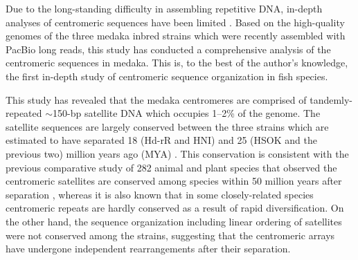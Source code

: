 Due to the long-standing difficulty in assembling repetitive DNA, in-depth analyses of centromeric sequences have been limited \cite{Plohl2014}. Based on the high-quality genomes of the three medaka inbred strains which were recently assembled with PacBio long reads, this study has conducted a comprehensive analysis of the centromeric sequences in medaka. This is, to the best of the author's knowledge, the first in-depth study of centromeric sequence organization in fish species.

This study has revealed that the medaka centromeres are comprised of tandemly-repeated $\sim$150-bp satellite DNA which occupies 1--2\% of the genome. The satellite sequences are largely conserved between the three strains which are estimated to have separated 18 (Hd-rR and HNI) and 25 (HSOK and the previous two) million years ago (MYA) \cite{Setiamarga2009}. This conservation is consistent with the previous comparative study of 282 animal and plant species that observed the centromeric satellites are conserved among species within 50 million years after separation \cite{Melters2013}, whereas it is also known that in some closely-related species centromeric repeats are hardly conserved as a result of rapid diversification\cite{Lee2005}. On the other hand, the sequence organization including linear ordering of satellites were not conserved among the strains, suggesting that the centromeric arrays have undergone independent rearrangements after their separation.

